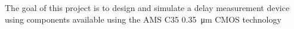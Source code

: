 The goal of this project is to design and simulate a delay measurement device using components available using the AMS C35 \SI{0.35}{\micro\meter} CMOS technology
